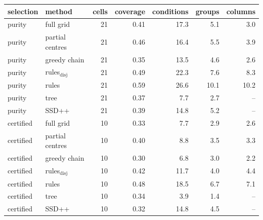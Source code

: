 \begin{tabular}{llrrrrr}
\toprule
selection & method & cells & coverage & conditions & groups & columns\\
\midrule
purity & full grid & 21 & 0.41 & 17.3 & 5.1 & 3.0\\
purity & partial centres & 21 & 0.46 & 16.4 & 5.5 & 3.9\\
purity & greedy chain & 21 & 0.35 & 13.5 & 4.6 & 2.6\\
purity & rules$_{\mathrm{disj}}$ & 21 & 0.49 & 22.3 & 7.6 & 8.3\\
purity & rules & 21 & 0.59 & 26.6 & 10.1 & 10.2\\
purity & tree & 21 & 0.37 & 7.7 & 2.7 & --\\
purity & SSD++ & 21 & 0.39 & 14.8 & 5.2 & --\\
\midrule
certified & full grid & 10 & 0.33 & 7.7 & 2.9 & 2.6\\
certified & partial centres & 10 & 0.40 & 8.8 & 3.5 & 3.3\\
certified & greedy chain & 10 & 0.30 & 6.8 & 3.0 & 2.2\\
certified & rules$_{\mathrm{disj}}$ & 10 & 0.42 & 11.7 & 4.0 & 4.4\\
certified & rules & 10 & 0.48 & 18.5 & 6.7 & 7.1\\
certified & tree & 10 & 0.34 & 3.9 & 1.4 & --\\
certified & SSD++ & 10 & 0.32 & 14.8 & 4.5 & --\\
\bottomrule
\end{tabular}
